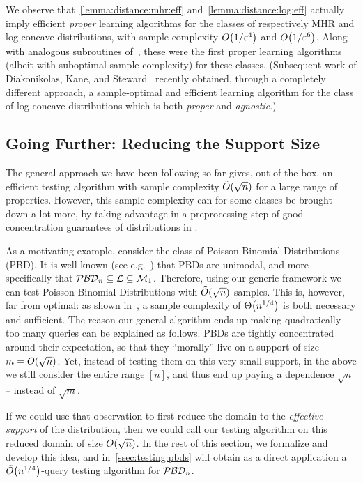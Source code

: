 We observe that~\cref{lemma:distance:mhr:eff} and~\cref{lemma:distance:log:eff} actually imply efficient \emph{proper} learning algorithms for the classes of respectively MHR and log-concave distributions, with sample complexity $\bigO{1/\eps^4}$ and $\bigO{1/\eps^6}$. Along with analogous subroutines of~\cite{ADK:15}, these were the first proper learning algorithms (albeit with suboptimal sample complexity) for these classes. (Subsequent work of Diakonikolas, Kane, and Steward~\cite{DKS:16} recently obtained, through a completely different approach, a sample-optimal and efficient learning algorithm for the class of log-concave distributions which is both \emph{proper} and \emph{agnostic}.)
 
\subsection{Going Further: Reducing the Support Size}\label{sec:effectivesupport}
  The general approach we have been following so far gives, out-of-the-box, an efficient testing algorithm with sample complexity $\tildeO{\sqrt{n}}$ for a large range of properties. However, this sample complexity can for some classes \property be brought down a lot more, by taking advantage in a preprocessing step of good concentration guarantees of distributions in \property.\medskip

\noindent As a motivating example, consider the class of Poisson Binomial Distributions (PBD). It is well-known (see e.g.~\cite[Section 2]{KG:71}) that PBDs are unimodal, and more specifically that $\mathcal{PBD}_n\subseteq\mathcal{L}\subseteq\mathcal{M}_{1}$. Therefore, using our generic framework we can test Poisson Binomial Distributions with $\tildeO{\sqrt{n}}$ samples. This is, however, far from optimal: as shown in~\cite{AD:15}, a sample complexity of $\bigTheta{n^{1/4}}$ is both necessary and sufficient. The reason our general algorithm ends up making quadratically too many queries can be explained as follows. PBDs are tightly concentrated around their expectation, so that they ``morally'' live on a support of size $m=\bigO{\sqrt{n}}$. Yet, instead of testing them on this very small support, in the above we still consider the entire range $[n]$, and thus end up paying a dependence $\sqrt{n}$ -- instead of $\sqrt{m}$.

If we could use that observation to first reduce the domain to the \emph{effective support} of the distribution, then we could call our testing algorithm on this reduced domain of size $\bigO{\sqrt{n}}$. In the rest of this section, we formalize and develop this idea, and in~\cref{ssec:testing:pbds} will obtain as a direct application a $\tildeO{n^{1/4}}$-query testing algorithm for $\mathcal{PBD}_n$.

